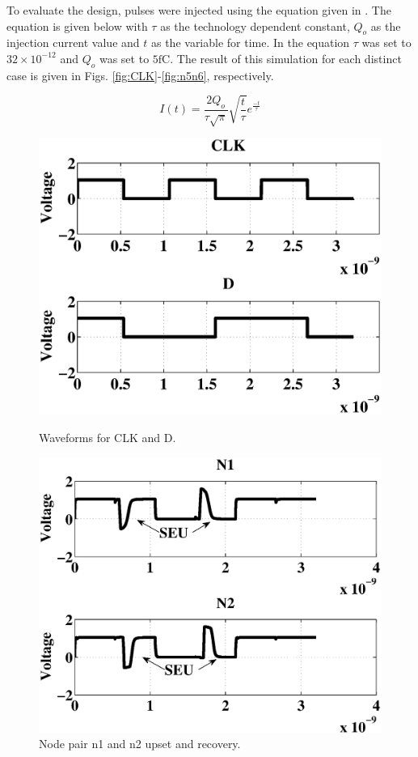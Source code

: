 To evaluate the design, pulses were injected using the equation given in \cite{injeq}. The equation is given below with $\tau$ as the technology dependent constant, $Q_o$ as the injection current value and $t$ as the variable for time. In the equation $\tau$ was set to $32\times10^{-12}$ and $Q_o$ was set to $5\text{fC}$. The result of this simulation for each distinct case is given in Figs. \ref{fig:CLK}-\ref{fig:n5n6}, respectively. 

\begin{equation}\label{qeq}
	I(t)=\frac{2Q_o}{\tau\sqrt{\pi}}\sqrt{\frac{t}{\tau}}e^{\frac{-t}{\tau}}
\end{equation}

\begin{figure}[!htbp]
	\centering
	\parbox{4cm}{
		\includegraphics[width=1.15\linewidth]{Figures/WavePlots/CLKD.eps}
		\caption{Waveforms for CLK and D.}
		\label{fig:CLK}}
	\qquad
	\begin{minipage}{4cm}
		\includegraphics[width=\linewidth]{Figures/WavePlots/n1n2.eps}
		\caption{Node pair n1 and n2 upset and recovery.}
		\label{fig:n1n2}
	\end{minipage}
\end{figure}

